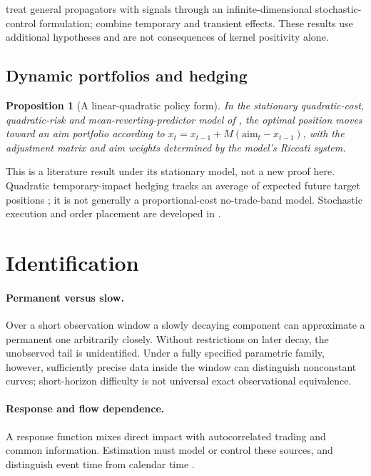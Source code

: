 \documentclass[11pt]{article}
\numberwithin{equation}{section}
\newtheorem{proposition}[theorem]{Proposition}
\theoremstyle{definition}
\theoremstyle{remark}
\theoremstyle{definition}
\begin{document}
\citet{abijaberneuman2022} treat general propagators with signals through an
infinite-dimensional stochastic-control formulation; \citet{neumannvoss2022}
combine temporary and transient effects. These results use additional
hypotheses and are not consequences of kernel positivity alone.

\subsection{Dynamic portfolios and hedging}
\begin{proposition}[A linear-quadratic policy form]\label{prop:gp}
In the stationary quadratic-cost, quadratic-risk and mean-reverting-predictor
model of \citet{garleanupedersen2013}, the optimal position moves toward an aim
portfolio according to
$ x_t=x_{t-1}+M(\mathrm{aim}_t-x_{t-1})$,
with the adjustment matrix and aim weights determined by the model's Riccati
system.
\end{proposition}
This is a literature result under its stationary model, not a new proof here.
Quadratic temporary-impact hedging tracks an average of expected future target
positions \citep{banksoner2017}; it is not generally a proportional-cost
no-trade-band model. Stochastic execution and order placement are developed in
\citet{carteajaimungal2015,gueant2016,gatheralschied2011,lehallemounjid2017}.

\section{Identification}\label{sec:ident}
\paragraph{Permanent versus slow.}
Over a short observation window a slowly decaying component can approximate a
permanent one arbitrarily closely. Without restrictions on later decay, the
unobserved tail is unidentified. Under a fully specified parametric family,
however, sufficiently precise data inside the window can distinguish nonconstant
curves; short-horizon difficulty is not universal exact observational equivalence.

\paragraph{Response and flow dependence.}
A response function mixes direct impact with autocorrelated trading and common
information. Estimation must model or control these sources, and distinguish
event time from calendar time \citep{bouchaud2004,bouchaud2018}.
\end{document}

